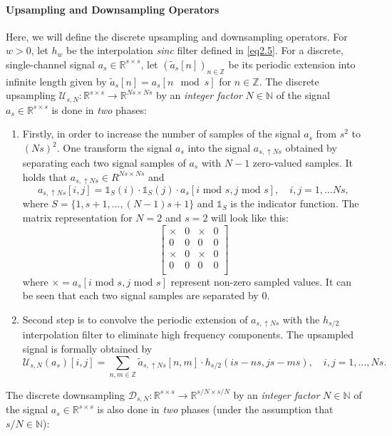 \documentclass[reqno,10pt]{amsart}
\theoremstyle{plain}
\theoremstyle{definition}
\newcommand{\bb}[1]{\mathbb{#1}}
\newcommand{\cal}[1]{\mathcal{#1}}
\begin{document}
    \paragraph{\bf Upsampling and Downsampling Operators} Here, we will define the discrete upsampling and downsampling operators. For $w > 0$, let $h_w$ be the interpolation {\it sinc} filter defined in \ref{eq2.5}. For a discrete, single-channel signal $a_s \in \bb R^{s\times s}$, let $(\tilde{a}_s[n])_{n \in \bb Z}$ be its periodic extension into infinite length given by $\tilde{a}_s[n] = a_s[n \mod s]$ for ${n \in \bb Z}$. The discrete upsampling $\cal U_{s,N} : \bb R^{s\times s} \to \bb R^{Ns \times Ns}$ by an {\it integer factor} $N \in \bb N$ of the signal $a_s \in \bb R^{s\times s}$ is done in {\it two} phases:
    \begin{enumerate}
        \item Firstly, in order to increase the number of samples of the signal $a_s$ from $s^2$ to $(Ns)^2$. One transform the signal $a_s$ into the signal $a_{s,\uparrow Ns}$ obtained by separating each two signal samples of $a_s$ with $N-1$ zero-valued samples. It holds that $a_{s,\uparrow Ns} \in R^{Ns \times Ns}$ and 
        $$ a_{s,\uparrow Ns}[i,j] = \mathds{1}_S (i) \cdot \mathds{1}_S(j) \cdot a_s[i \text{ mod } s, j \text{ mod }s], \quad i,j = 1, \dots Ns,$$
        where $S = \{1, s+1, \dots ,(N-1)s + 1\} $ and $\mathds{1}_S$ is the indicator function. The matrix representation for $N=2$ and $s=2$ will look like this:
        $$\begin{bmatrix}
            \times &0 &\times&0 \\
            0 &0&0 &0\\
            \times &0&\times&0\\
            0 &0&0 &0\\
        \end{bmatrix}$$
        where $\times = a_s[i \text{ mod } s, j \text{ mod } s]$ represent non-zero sampled values. It can be seen that each two signal samples are separated by $0$.
        \item Second step is to convolve the periodic extension of $a_{s,\uparrow Ns}$ with the $h_{s/2}$ interpolation filter to eliminate high frequency components. The upsampled signal is formally obtained by
        $$ \cal U_{s,N}(a_s)[i,j] = \sum_{n,m \in \bb Z} \tilde{a}_{s,\uparrow Ns}[n,m] \cdot h_{s/2} (is - ns, js - ms), \quad i,j = 1, \dots, Ns.$$
    \end{enumerate}
    The discrete downsampling $\cal D_{s,N}: \bb R^{s\times s} \to \bb R^{s/N \times s/N}$ by an {\it integer factor} $N \in \bb N$ of the signal $a_s \in \bb R^{s\times s}$ is also done in {\it two} phases (under the assumption that $s/N \in \bb N$):
\end{document}
